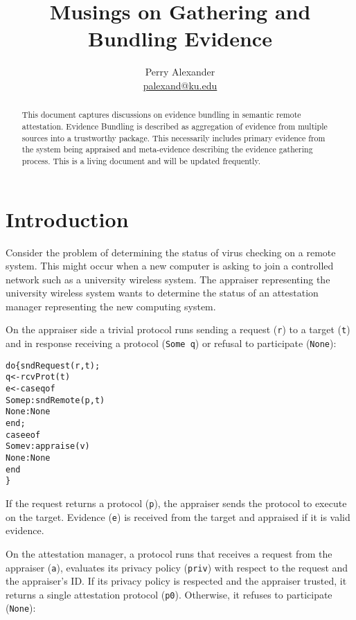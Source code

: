 \documentclass[10pt]{article}
\title{Musings on Gathering and Bundling Evidence}
\author{Perry Alexander \\
 \url{palexand@ku.edu}}
\begin{document}
\maketitle

\begin{abstract}
  This document captures discussions on evidence bundling in semantic
  remote attestation.  Evidence Bundling is described as aggregation
  of evidence from multiple sources into a trustworthy package.  This
  necessarily includes primary evidence from the system being
  appraised and meta-evidence describing the evidence gathering
  process.  This is a living document and will be updated frequently.
\end{abstract}

\section{Introduction}

Consider the problem of determining the status of virus checking on a
remote system.  This might occur when a new computer is asking to join
a controlled network such as a university wireless system.  The
appraiser representing the university wireless system wants to
determine the status of an attestation manager representing the new
computing system.

On the appraiser side a trivial protocol runs sending a request
(\Verb+r+) to a target (\Verb+t+) and in response receiving a protocol
(\Verb+Some q+) or refusal to participate (\Verb+None+):

\begin{alltt}
  do \{ sndRequest(r,t);
       q <- rcvProt(t)
       e <- case q of
              Some p : sndRemote(p,t)
              None : None
            end;
       case e of 
         Some v : appraise(v)
         None : None
       end
  \}
\end{alltt}

If the request returns a protocol (\Verb+p+), the appraiser sends the
protocol to execute on the target. Evidence (\Verb+e+) is received
from the target and appraised if it is valid evidence.

On the attestation manager, a protocol runs that receives a request
from the appraiser (\Verb+a+), evaluates its privacy policy
(\Verb+priv+) with respect to the request and the appraiser's ID.  If
its privacy policy is respected and the appraiser trusted, it returns
a single attestation protocol (\Verb+p0+).  Otherwise, it refuses to
participate (\Verb+None+):
\end{document}
